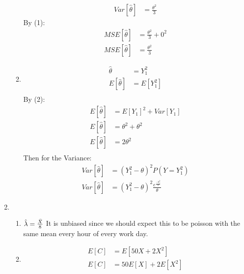 \documentclass{article}
\begin{document}
\begin{enumerate}
\begin{enumerate}
\begin{equation*}
\begin{split}
Var[\hat{\theta}] &= \frac{\theta^{2}}{3}
\end{split}
\end{equation*}
By (1):
\begin{equation*}
\begin{split}
MSE[\hat{\theta}] &= \frac{\theta^{2}}{3} + 0^{2} \\
MSE[\hat{\theta}] &= \frac{\theta^{2}}{3}
\end{split}
\end{equation*}
\item
\begin{equation*}
\begin{split}
\hat{\theta} &= Y_{1}^{2}\\
E[\hat{\theta}] &= E[Y_{1}^{2}]\\
\end{split}
\end{equation*}
By (2):
\begin{equation*}
\begin{split}
E[\hat{\theta}] &= E[Y_{1}]^{2}+Var[Y_{1}]\\
E[\hat{\theta}] &=  \theta^{2}+\theta^{2} \\
E[\hat{\theta}] &=  2\theta^{2}\\
\end{split}
\end{equation*}
Then for the Variance:
\begin{equation*}
\begin{split}
Var[\hat{\theta}] &= (Y_{1}^{2} - \theta)^{2}P(Y=Y_{1}^{2}) \\
Var[\hat{\theta}] &= (Y_{1}^{2} - \theta)^{2}\frac{e^\frac{-Y_{1}^{2}}{\theta}}{\theta}
\end{split}
\end{equation*}
\end{enumerate}
\item
\begin{enumerate}
\item
$
\hat{\lambda} = \frac{\bar{X}}{8} \\
$
It is unbiased since we should expect this to be poisson with the same mean every hour of every work day. 
\item
\begin{equation*}
\begin{split}
E[C] &= E[50X + 2X^{2}] \\
E[C] &= 50E[X] + 2E[X^{2}] \\
\end{split}
\end{equation*}

\end{enumerate}
\end{enumerate}
\end{document}
